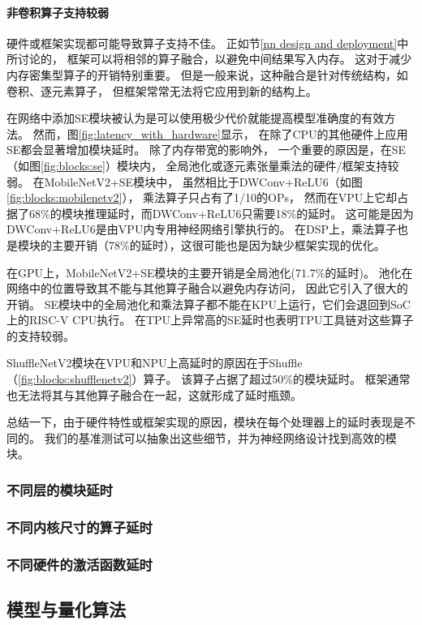 \paragraph{非卷积算子支持较弱}
硬件或框架实现都可能导致算子支持不佳。
正如节\ref{nn design and deployment}中所讨论的，
框架可以将相邻的算子融合，以避免中间结果写入内存。
这对于减少内存密集型算子的开销特别重要。
但是一般来说，这种融合是针对传统结构，如卷积、逐元素算子，
但框架常常无法将它应用到新的结构上。

在网络中添加SE模块被认为是可以使用极少代价就能提高模型准确度的有效方法。
然而，图\ref{fig:latency_with_hardware}显示，
在除了CPU的其他硬件上应用SE都会显著增加模块延时。
除了内存带宽的影响外，
一个重要的原因是，在SE（如图\ref{fig:blocks:se}）模块内，
全局池化或逐元素张量乘法的硬件/框架支持较弱。
在MobileNetV2+SE模块中，
虽然相比于DWConv+ReLU6（如图\ref{fig:blocks:mobilenetv2}），
乘法算子只占有了1/10的OPs，
然而在VPU上它却占据了68\%的模块推理延时，而DWConv+ReLU6只需要18\%的延时。
这可能是因为DWConv+ReLU6是由VPU内专用神经网络引擎执行的。
在DSP上，乘法算子也是模块的主要开销（78\%的延时），这很可能也是因为缺少框架实现的优化。

在GPU上，MobileNetV2+SE模块的主要开销是全局池化(71.7\%的延时)。
池化在网络中的位置导致其不能与其他算子融合以避免内存访问，
因此它引入了很大的开销。
SE模块中的全局池化和乘法算子都不能在KPU上运行，它们会退回到SoC上的RISC-V CPU执行。
在TPU上异常高的SE延时也表明TPU工具链对这些算子的支持较弱。

ShuffleNetV2模块在VPU和NPU上高延时的原因在于Shuffle（\ref{fig:blocks:shufflenetv2}）算子。
该算子占据了超过50\%的模块延时。
框架通常也无法将其与其他算子融合在一起，这就形成了延时瓶颈。

总结一下，由于硬件特性或框架实现的原因，模块在每个处理器上的延时表现是不同的。
我们的基准测试可以抽象出这些细节，并为神经网络设计找到高效的模块。

\subsubsection{不同层的模块延时}
\label{analysis:op block:block with layer}

\subsubsection{不同内核尺寸的算子延时}
\label{analysis:op block:op with ksize}

\subsubsection{不同硬件的激活函数延时}
\label{analysis:op block:activation with hardware}

\subsection{模型与量化算法}
\label{analysis:model quantization}